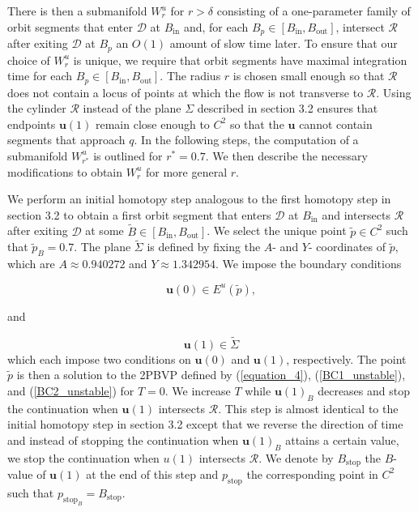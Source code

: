 \documentclass{ws-ijbc}
\begin{document}
There is then a submanifold $W^u_r$ for $r>\delta$ consisting of a one-parameter family of orbit segments that enter $\mathscr{D}$ at $B_{\mathrm{in}}$ and, for each $B_p \in [B_{\mathrm{in}}, B_{\mathrm{out}}]$, intersect $\mathscr{R}$ after exiting $\mathscr{D}$ at $B_p$ an $O(1)$ amount of slow time later.  To ensure that our choice of $W^u_r$ is unique, we require that orbit segments have maximal integration time for each $B_p \in [B_{\mathrm{in}}, B_{\mathrm{out}}]$.  The radius $r$ is chosen small enough so that $\mathscr{R}$ does not contain a locus of points at which the flow is not transverse to $\mathscr{R}$.  Using the cylinder $\mathscr{R}$ instead of the plane $\Sigma$ described in section 3.2 ensures that endpoints $\mathbf{u}(1)$ remain close enough to $C^2$ so that the $\mathbf{u}$ cannot contain segments that approach $q$.  In the following steps, the computation of a submanifold $W^u_{r^*}$ is outlined for $r^*=0.7$.  We then describe the necessary modifications to obtain $W^u_r$ for more general $r$. 

We perform an initial homotopy step analogous to the first homotopy step in section 3.2 to obtain a first orbit segment that enters $\mathscr{D}$ at $B_{\mathrm{in}}$ and intersects $\mathscr{R}$ after exiting $\mathscr{D}$ at some $\tilde{B} \in [B_{\mathrm{in}}, B_{\mathrm{out}}]$.  We select the unique point $\tilde{p} \in C^2$ such that $\tilde{p}_B=0.7$.  The plane $\tilde{\Sigma}$ is defined by fixing the $A$- and $Y$- coordinates of $\tilde{p}$, which are $A \approx 0.940272$ and $Y \approx 1.342954$.  We impose the boundary conditions

\begin{equation}
\mathbf{u}(0) \in E^u(\tilde{p}),
\label{BC1_unstable}
\end{equation}

\noindent
and 

\begin{equation}
\mathbf{u}(1) \in \tilde{\Sigma}
\label{BC2_unstable}
\end{equation}
\noindent
which each impose two conditions on $\mathbf{u}(0)$ and $\mathbf{u}(1)$, respectively.  The point $\tilde{p}$ is then a solution to the 2PBVP defined by (\ref{equation_4}), (\ref{BC1_unstable}), and (\ref{BC2_unstable}) for $T=0$.  We increase $T$ while $\mathbf{u}(1)_B$ decreases and stop the continuation when $\mathbf{u}(1)$ intersects $\mathscr{R}$.  This step is almost identical to the initial homotopy step in section 3.2 except that we reverse the direction of time and instead of stopping the continuation when $\mathbf{u}(1)_B$ attains a certain value, we stop the continuation when $u(1)$ intersects $\mathscr{R}$.  We denote by $B_{\mathrm{stop}}$ the $B$-value of $\mathbf{u}(1)$ at the end of this step and $p_{\text{stop}}$ the corresponding point in $C^2$ such that $p_{\text{stop}_B}=B_{\text{stop}}$.
\end{document}
